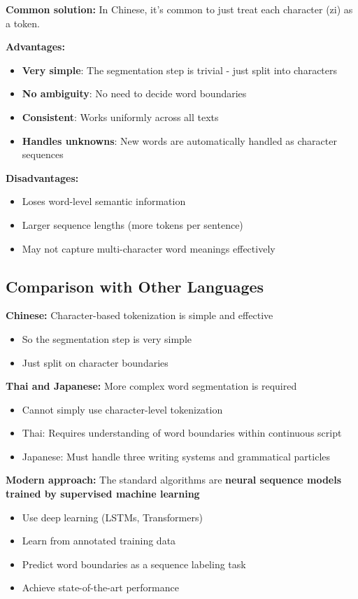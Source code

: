 \documentclass[11pt,a4paper]{article}
\theoremstyle{definition}
\theoremstyle{plain}
\theoremstyle{remark}
\begin{document}
\textbf{Common solution:} In Chinese, it's common to just treat each character (zi) as a token.

\textbf{Advantages:}
\begin{itemize}
    \item \textbf{Very simple}: The segmentation step is trivial - just split into characters
    \item \textbf{No ambiguity}: No need to decide word boundaries
    \item \textbf{Consistent}: Works uniformly across all texts
    \item \textbf{Handles unknowns}: New words are automatically handled as character sequences
\end{itemize}

\textbf{Disadvantages:}
\begin{itemize}
    \item Loses word-level semantic information
    \item Larger sequence lengths (more tokens per sentence)
    \item May not capture multi-character word meanings effectively
\end{itemize}

\subsection{Comparison with Other Languages}

\textbf{Chinese:} Character-based tokenization is simple and effective
\begin{itemize}
    \item So the segmentation step is very simple
    \item Just split on character boundaries
\end{itemize}

\textbf{Thai and Japanese:} More complex word segmentation is required
\begin{itemize}
    \item Cannot simply use character-level tokenization
    \item Thai: Requires understanding of word boundaries within continuous script
    \item Japanese: Must handle three writing systems and grammatical particles
\end{itemize}

\textbf{Modern approach:} The standard algorithms are \textbf{neural sequence models trained by supervised machine learning}
\begin{itemize}
    \item Use deep learning (LSTMs, Transformers)
    \item Learn from annotated training data
    \item Predict word boundaries as a sequence labeling task
    \item Achieve state-of-the-art performance
\end{itemize}
\end{document}
